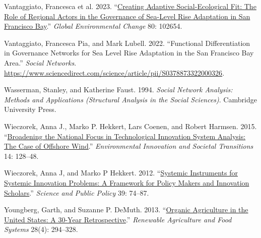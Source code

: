 \documentclass[twoside,12pt,final]{ucthesis-CA2012}
\newlength{\cslhangindent}
\newenvironment{CSLReferences}[2] %
 {%
  \setlength{\parindent}{0pt}
  \ifodd #1 \everypar{\setlength{\hangindent}{\cslhangindent}}\ignorespaces\fi
  \ifnum #2 > 0
  \setlength{\parskip}{#2\baselineskip}
  \fi
 }%
 {}
\begin{document}
\begin{ucmainmatter}
\begin{CSLReferences}{1}{0}
\leavevmode{}%
Vantaggiato, Francesca et al. 2023. {``\href{https://doi.org/10.1016/j.gloenvcha.2023.102654}{Creating Adaptive Social-Ecological Fit: The Role of Regional Actors in the Governance of Sea-Level Rise Adaptation in San Francisco Bay}.''} \emph{Global Environmental Change} 80: 102654.

\leavevmode{}%
Vantaggiato, Francesca Pia, and Mark Lubell. 2022. {``Functional Differentiation in Governance Networks for Sea Level Rise Adaptation in the San Francisco Bay Area.''} \emph{Social Networks}. \url{https://www.sciencedirect.com/science/article/pii/S0378873322000326}.

\leavevmode{}%
Wasserman, Stanley, and Katherine Faust. 1994. \emph{Social Network Analysis: Methods and Applications (Structural Analysis in the Social Sciences)}. Cambridge University Press.

\leavevmode{}%
Wieczorek, Anna J., Marko P. Hekkert, Lars Coenen, and Robert Harmsen. 2015. {``\href{https://doi.org/10.1016/j.eist.2014.09.001}{Broadening the National Focus in Technological Innovation System Analysis: The Case of Offshore Wind}.''} \emph{Environmental Innovation and Societal Transitions} 14: 128--48.

\leavevmode{}%
Wieczorek, Anna J, and Marko P Hekkert. 2012. {``\href{https://doi.org/10.1093/scipol/scr008}{Systemic Instruments for Systemic Innovation Problems: A Framework for Policy Makers and Innovation Scholars}.''} \emph{Science and Public Policy} 39: 74--87.

\leavevmode{}%
Youngberg, Garth, and Suzanne P. DeMuth. 2013. {``\href{https://doi.org/10.1017/S1742170513000173}{Organic Agriculture in the United States: A 30-Year Retrospective}.''} \emph{Renewable Agriculture and Food Systems} 28(4): 294--328.

\end{CSLReferences}
\end{ucmainmatter}
\end{document}
